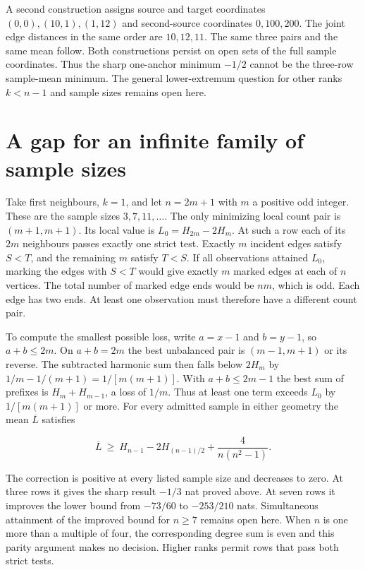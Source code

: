 A second construction assigns source and target coordinates \((0,0),(10,1),(1,12)\) and second-source coordinates \(0,100,200\). The joint edge distances in the same order are \(10,12,11\). The same three pairs and the same mean follow. Both constructions persist on open sets of the full sample coordinates. Thus the sharp one-anchor minimum \(-1/2\) cannot be the three-row sample-mean minimum. The general lower-extremum question for other ranks \(k<n-1\) and sample sizes remains open here.

\section{A gap for an infinite family of sample sizes}\label{a-gap-for-an-infinite-family-of-sample-sizes}

Take first neighbours, \(k=1\), and let \(n=2m+1\) with \(m\) a positive odd integer. These are the sample sizes \(3,7,11,\ldots\). The only minimizing local count pair is \((m+1,m+1)\). Its local value is \(L_0=H_{2m}-2H_m\). At such a row each of its \(2m\) neighbours passes exactly one strict test. Exactly \(m\) incident edges satisfy \(S<T\), and the remaining \(m\) satisfy \(T<S\). If all observations attained \(L_0\), marking the edges with \(S<T\) would give exactly \(m\) marked edges at each of \(n\) vertices. The total number of marked edge ends would be \(nm\), which is odd. Each edge has two ends. At least one observation must therefore have a different count pair.

To compute the smallest possible loss, write \(a=x-1\) and \(b=y-1\), so \(a+b\le2m\). On \(a+b=2m\) the best unbalanced pair is \((m-1,m+1)\) or its reverse. The subtracted harmonic sum then falls below \(2H_m\) by \(1/m-1/(m+1)=1/[m(m+1)]\). With \(a+b\le2m-1\) the best sum of prefixes is \(H_m+H_{m-1}\), a loss of \(1/m\). Thus at least one term exceeds \(L_0\) by \(1/[m(m+1)]\) or more. For every admitted sample in either geometry the mean \(\overline L\) satisfies

\[
\overline L\ \ge\ H_{n-1}-2H_{(n-1)/2}+\frac{4}{n(n^2-1)}.
\]

The correction is positive at every listed sample size and decreases to zero. At three rows it gives the sharp result \(-1/3\) nat proved above. At seven rows it improves the lower bound from \(-73/60\) to \(-253/210\) nats. Simultaneous attainment of the improved bound for \(n\ge7\) remains open here. When \(n\) is one more than a multiple of four, the corresponding degree sum is even and this parity argument makes no decision. Higher ranks permit rows that pass both strict tests.

